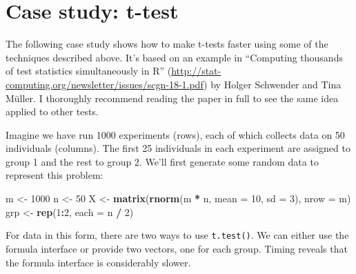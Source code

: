 \documentclass[]{book}
\newenvironment{Shaded}{\begin{snugshade}}{\end{snugshade}}
\newcommand{\CommentTok}[1]{\textcolor[rgb]{0.37,0.37,0.37}{\textit{#1}}}
\newcommand{\ControlFlowTok}[1]{\textcolor[rgb]{0.27,0.27,0.27}{\textbf{#1}}}
\newcommand{\DataTypeTok}[1]{\textcolor[rgb]{0.27,0.27,0.27}{#1}}
\newcommand{\DecValTok}[1]{\textcolor[rgb]{0.06,0.06,0.06}{#1}}
\newcommand{\KeywordTok}[1]{\textcolor[rgb]{0.27,0.27,0.27}{\textbf{#1}}}
\newcommand{\NormalTok}[1]{#1}
\newcommand{\OperatorTok}[1]{\textcolor[rgb]{0.43,0.43,0.43}{\textbf{#1}}}
\newcommand{\StringTok}[1]{\textcolor[rgb]{0.5,0.5,0.5}{#1}}
\renewcommand{\href}[2]{#2 (\url{#1})}
\begin{document}
\hypertarget{t-test}{%
\section{Case study: t-test}\label{t-test}}

The following case study shows how to make t-tests faster using some of the techniques described above. It's based on an example in \href{http://stat-computing.org/newsletter/issues/scgn-18-1.pdf}{``Computing thousands of test statistics simultaneously in R''} by Holger Schwender and Tina Müller. I thoroughly recommend reading the paper in full to see the same idea applied to other tests.

Imagine we have run 1000 experiments (rows), each of which collects data on 50 individuals (columns). The first 25 individuals in each experiment are assigned to group 1 and the rest to group 2. We'll first generate some random data to represent this problem:

\begin{Shaded}
\begin{Highlighting}[]
\NormalTok{m <-}\StringTok{ }\DecValTok{1000}
\NormalTok{n <-}\StringTok{ }\DecValTok{50}
\NormalTok{X <-}\StringTok{ }\KeywordTok{matrix}\NormalTok{(}\KeywordTok{rnorm}\NormalTok{(m }\OperatorTok{*}\StringTok{ }\NormalTok{n, }\DataTypeTok{mean =} \DecValTok{10}\NormalTok{, }\DataTypeTok{sd =} \DecValTok{3}\NormalTok{), }\DataTypeTok{nrow =}\NormalTok{ m)}
\NormalTok{grp <-}\StringTok{ }\KeywordTok{rep}\NormalTok{(}\DecValTok{1}\OperatorTok{:}\DecValTok{2}\NormalTok{, }\DataTypeTok{each =}\NormalTok{ n }\OperatorTok{/}\StringTok{ }\DecValTok{2}\NormalTok{)}
\end{Highlighting}
\end{Shaded}

For data in this form, there are two ways to use \texttt{t.test()}. We can either use the formula interface or provide two vectors, one for each group. Timing reveals that the formula interface is considerably slower.

\begin{Shaded}
\end{Shaded}
\end{document}
